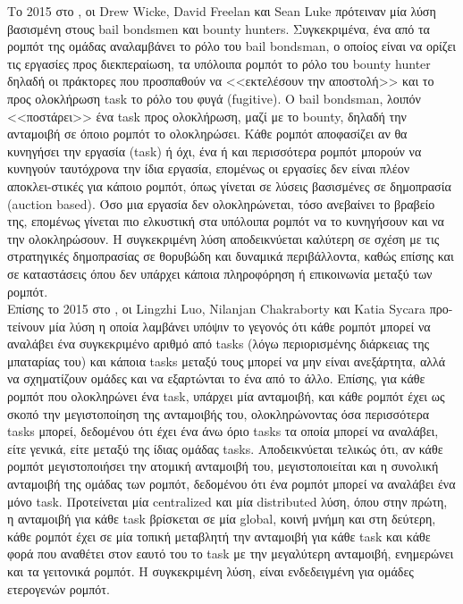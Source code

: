 	 Το 2015 στο \cite{Wicke2015}, οι Drew Wicke, David Freelan και Sean Luke πρότειναν μία λύση βασισμένη στους bail bondsmen και bounty hunters.
	 Συγκεκριμένα, ένα από τα ρομπότ της ομάδας αναλαμβάνει το ρόλο του bail bondsman, ο οποίος είναι να ορίζει τις εργασίες προς διεκπεραίωση, τα υπόλοιπα ρομπότ το ρόλο του bounty hunter δηλαδή οι πράκτορες που προσπαθούν να <<εκτελέσουν την αποστολή>> και το προς ολοκλήρωση 
	 task το ρόλο του φυγά (fugitive). Ο bail bondsman, λοιπόν <<ποστάρει>> ένα task προς ολοκλήρωση, μαζί με το
	 bounty, δηλαδή την ανταμοιβή σε όποιο ρομπότ το ολοκληρώσει. Κάθε ρομπότ αποφασίζει αν θα κυνηγήσει την εργασία (task) ή όχι, ένα ή και
	 περισσότερα ρομπότ μπορούν να κυνηγούν ταυτόχρονα την ίδια εργασία, επομένως οι εργασίες δεν είναι πλέον αποκλει-στικές για κάποιο ρομπότ,
	 όπως γίνεται σε λύσεις βασισμένες σε δημοπρασία (auction based). Όσο μια εργασία δεν ολοκληρώνεται, τόσο ανεβαίνει το βραβείο της, επομένως γίνεται πιο ελκυστική
	 στα υπόλοιπα ρομπότ να το κυνηγήσουν και να την ολοκληρώσουν. Η συγκεκριμένη λύση αποδεικνύεται καλύτερη σε σχέση με τις στρατηγικές δημοπρασίας σε θορυβώδη και δυναμικά περιβάλλοντα, καθώς επίσης και σε καταστάσεις όπου δεν υπάρχει κάποια πληροφόρηση ή επικοινωνία 
	 μεταξύ των ρομπότ.\\
	 
	 Επίσης το 2015 στο \cite{luo2015}, οι Lingzhi Luo, Nilanjan Chakraborty και Katia Sycara προ-τείνουν μία λύση η οποία λαμβάνει υπόψιν το γεγονός
	 ότι κάθε ρομπότ μπορεί να αναλάβει ένα συγκεκριμένο αριθμό από tasks (λόγω περιορισμένης διάρκειας της μπαταρίας του) και κάποια tasks
	 μεταξύ τους μπορεί να μην είναι ανεξάρτητα, αλλά να σχηματίζουν ομάδες και να εξαρτώνται το ένα από το άλλο. Επίσης, για κάθε ρομπότ που
	 ολοκληρώνει ένα task, υπάρχει μία ανταμοιβή, και κάθε ρομπότ έχει ως σκοπό την μεγιστοποίηση της ανταμοιβής του, ολοκληρώνοντας όσα
	 περισσότερα tasks μπορεί, δεδομένου ότι έχει ένα άνω όριο tasks τα οποία μπορεί να αναλάβει, είτε γενικά, είτε μεταξύ της ίδιας ομάδας
	 tasks. Αποδεικνύεται τελικώς ότι, αν κάθε ρομπότ μεγιστοποιήσει την ατομική ανταμοιβή του, μεγιστοποιείται και η συνολική ανταμοιβή της
	 ομάδας των ρομπότ, δεδομένου ότι ένα ρομπότ μπορεί να αναλάβει ένα μόνο task. Προτείνεται μία centralized και μία distributed λύση, όπου
	 στην πρώτη, η ανταμοιβή για κάθε task βρίσκεται σε μία global, κοινή μνήμη και στη δεύτερη, κάθε ρομπότ έχει σε μία τοπική μεταβλητή την
	 ανταμοιβή για κάθε task και κάθε φορά που αναθέτει στον εαυτό του το task με την μεγαλύτερη ανταμοιβή, ενημερώνει και τα γειτονικά ρομπότ.
	 Η συγκεκριμένη λύση, είναι ενδεδειγμένη για ομάδες ετερογενών ρομπότ.\\

